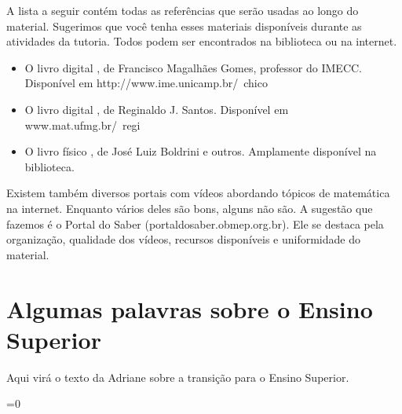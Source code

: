 \documentclass[10pt,openany,twoside=semi]{book}
\newcounter{testpage}
\newcommand{\clearquadruplepage}{	
   	\setcounter{testpage}{\intcalcMod{\thepage}{4}}   	
   	\ifnum\thetestpage=0
	   	\newpage
	\else
		\ifnum\thetestpage=1
			\newpage \thispagestyle{empty} \hbox{} \newpage \thispagestyle{empty} \hbox{} \newpage \thispagestyle{empty} \hbox{} \newpage
		\else
			\ifnum\thetestpage=2
				\newpage \thispagestyle{empty} \hbox{} \newpage \thispagestyle{empty} \hbox{} \newpage
			\else
				\ifnum\thetestpage=3
					\newpage \thispagestyle{empty} \hbox{} \newpage
				\fi
			\fi
		\fi	
	\fi
}
\theoremstyle{estiloQuestao}
\theoremstyle{estiloQuestao}
\theoremstyle{estiloQuestao}
\theoremstyle{plain}
\theoremstyle{estiloSetinha}
\theoremstyle{estiloSetinha}
\theoremstyle{estiloSetinha}
\theoremstyle{estiloSetinha}
\begin{document}
A lista a seguir contém todas as referências que serão usadas ao longo do material. Sugerimos que você tenha esses materiais disponíveis durante as atividades da tutoria. Todos podem ser encontrados na biblioteca ou na internet.

\begin{itemize}
 \item O livro digital , de Francisco Magalhães Gomes, professor do IMECC. Disponível em http://www.ime.unicamp.br/~chico
 \item O livro digital , de Reginaldo J. Santos. Disponível em www.mat.ufmg.br/~regi
 \item O livro físico , de José Luiz Boldrini e outros. Amplamente disponível na biblioteca.
\end{itemize}

Existem também diversos portais com vídeos abordando tópicos de matemática na internet. Enquanto vários deles são bons, alguns não são. A sugestão que fazemos é o Portal do Saber (portaldosaber.obmep.org.br). Ele se destaca pela organização, qualidade dos vídeos, recursos disponíveis e uniformidade do material.

\section{Algumas palavras sobre o Ensino Superior}

Aqui virá o texto da Adriane sobre a transição para o Ensino Superior.

\ifnum{}=0
	\clearquadruplepage
\fi









 




 
\end{document}
